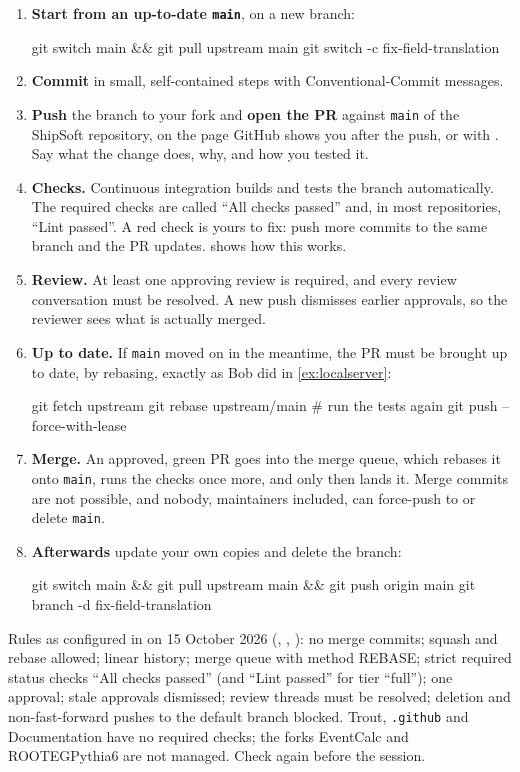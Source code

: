\begin{enumerate}
\item \textbf{Start from an up-to-date \texttt{main}}, on a new branch:
\begin{shell}
git switch main && git pull upstream main
git switch -c fix-field-translation
\end{shell}
\item \textbf{Commit} in small, self-contained steps with Conventional-Commit
  messages.
\item \textbf{Push} the branch to your fork and \textbf{open the PR} against
  \texttt{main} of the ShipSoft repository, on the page GitHub shows you after
  the push, or with . Say what the change does, why, and how
  you tested it.
\item \textbf{Checks.} Continuous integration builds and tests the branch
  automatically. The required checks are called ``All checks passed'' and, in
  most repositories, ``Lint passed''. A red check is yours to fix: push more
  commits to the same branch and the PR updates.  shows how this
  works.
\item \textbf{Review.} At least one approving review is required, and every
  review conversation must be resolved. A new push dismisses earlier
  approvals, so the reviewer sees what is actually merged.
\item \textbf{Up to date.} If \texttt{main} moved on in the meantime, the PR
  must be brought up to date, by rebasing, exactly as Bob did in
  \cref{ex:localserver}:
\begin{shell}
git fetch upstream
git rebase upstream/main
# run the tests again
git push --force-with-lease
\end{shell}
\item \textbf{Merge.} An approved, green PR goes into the merge queue, which
  rebases it onto \texttt{main}, runs the checks once more, and only then
  lands it. Merge commits are not possible, and nobody, maintainers included,
  can force-push to or delete \texttt{main}.
\item \textbf{Afterwards} update your own copies and delete the branch:
\begin{shell}
git switch main && git pull upstream main && git push origin main
git branch -d fix-field-translation
\end{shell}
\end{enumerate}

\begin{organisernote}
Rules as configured in  on 15 October 2026
(, ,
): no merge commits; squash and rebase allowed;
linear history; merge queue with method REBASE; strict required status
checks ``All checks passed'' (and ``Lint passed'' for tier ``full''); one
approval; stale approvals dismissed; review threads must be resolved;
deletion and non-fast-forward pushes to the default branch blocked.
Trout, \texttt{.github} and Documentation have no required checks; the
forks EventCalc and ROOTEGPythia6 are not managed. Check again before the
session.
\end{organisernote}


